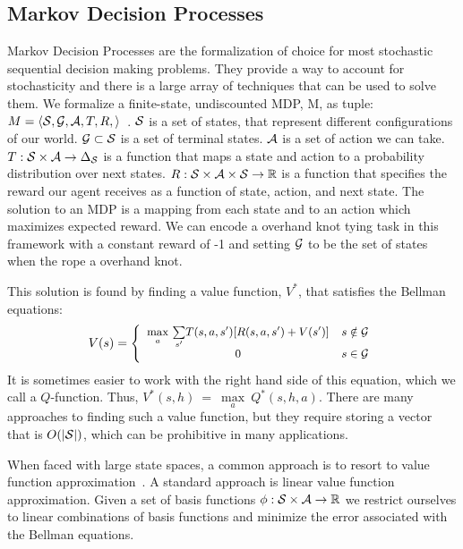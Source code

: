 \subsection{Markov Decision Processes}
Markov Decision Processes are the formalization of choice for most stochastic sequential decision making problems.
They provide a way to account for stochasticity and there is a large array of techniques that can be used to solve them.
We formalize a finite-state, undiscounted MDP, M, as tuple: $M = \langle\mathcal{S},\mathcal{G}, \mathcal{A},T,R, \rangle$~\cite{puterman1994}.
$\mathcal{S}{}$ is a set of states, that represent different configurations of our world.
$\mathcal{G}{} \subset \mathcal{S}{}$ is a set of terminal states.  
$\mathcal{A}{}$ is a set of action we can take.
$T:\mathcal{S}{} \times \mathcal{A}{} \rightarrow \Delta_{\mathcal{S}{}}$ is a function that maps a state and action to a probability distribution over next states.
$R:\mathcal{S}{}\times \mathcal{A}{} \times \mathcal{S}{} \rightarrow \mathbb{R}$ is a function that specifies the reward our agent receives as a function of state, action, and next state.
The solution to an MDP is a mapping from each state and to an action which maximizes expected reward. 
We can encode a overhand knot tying task in this framework with a constant reward of -1 
and setting $\mathcal{G}{}$ to be the set of states when the rope a overhand knot.

This solution is found by finding a value function, $V^*$, that satisfies the Bellman equations:
$${\footnotesize V(s) = \left\{ \begin{array}{cl} \underset{a}{\max}\ \underset{s'}{\sum} T(s, a, s')[R(s, a, s') + V(s')] & s\notin \goalset{}\\ 0 & s\in \goalset{}\end{array}\right.}$$
It is sometimes easier to work with the right hand side of this equation, which we call a $Q$-function. Thus, $V^*(s, h)~=~\underset{a}{\max}\ Q^*(s, h, a)$.
There are many approaches to finding such a value function, but they require storing a vector that is $O(|\mathcal{S}{}|)$, which can be prohibitive in many applications. 


When faced with large state spaces, a common approach is to resort to value function approximation~\cite{schweitzer1985generalized}. 
A standard approach is linear value function approximation. 
Given a set of basis functions $\phi: \mathcal{S}{}\times \mathcal{A}{} \rightarrow \mathbb{R}$ we restrict ourselves to linear combinations of basis functions
and minimize the error associated with the Bellman equations. 

